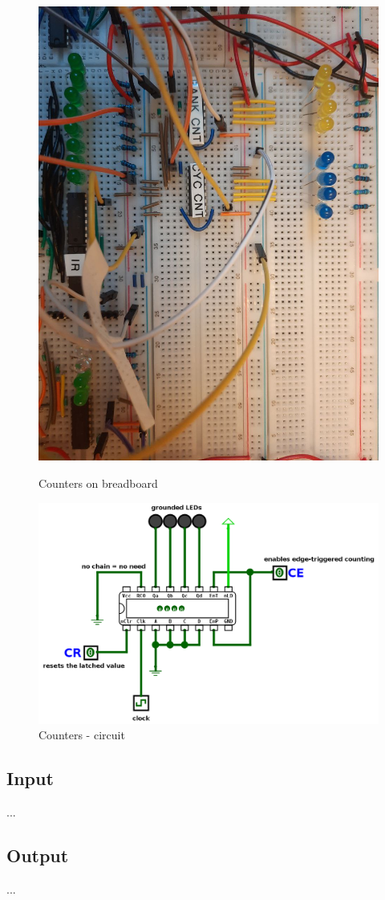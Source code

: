 \begin{figure}[H]
	\centering
	\begin{minipage}[b]{0.3\textwidth}
		\includegraphics[width=\textwidth]{img/counters}
		\caption{Counters on breadboard}
	\end{minipage}
	\hfill
	\begin{minipage}[b]{0.6\textwidth}
		\includegraphics[width=\textwidth]{img/counter_circuit_logisim}
		\caption{Counters - circuit}
	\end{minipage}
\end{figure}


\subsection{Input} \label{sec:implementation:input}
...

\subsection{Output} \label{sec:implementation:output}
...
